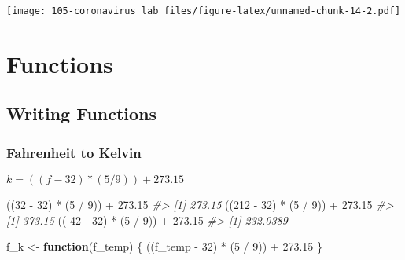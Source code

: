 \documentclass[
]{book}
\newenvironment{Shaded}{\begin{snugshade}}{\end{snugshade}}
\newcommand{\CommentTok}[1]{\textcolor[rgb]{0.56,0.35,0.01}{\textit{#1}}}
\newcommand{\ControlFlowTok}[1]{\textcolor[rgb]{0.13,0.29,0.53}{\textbf{#1}}}
\newcommand{\DecValTok}[1]{\textcolor[rgb]{0.00,0.00,0.81}{#1}}
\newcommand{\FloatTok}[1]{\textcolor[rgb]{0.00,0.00,0.81}{#1}}
\newcommand{\NormalTok}[1]{#1}
\newcommand{\OtherTok}[1]{\textcolor[rgb]{0.56,0.35,0.01}{#1}}
\newcommand{\SpecialCharTok}[1]{\textcolor[rgb]{0.00,0.00,0.00}{#1}}
\begin{document}
\texttt{[image: 105-coronavirus\_lab\_files/figure-latex/unnamed-chunk-14-2.pdf]}

\hypertarget{functions}{%
\chapter{Functions}\label{functions}}

\hypertarget{writing-functions}{%
\section{Writing Functions}\label{writing-functions}}

\hypertarget{fahrenheit-to-kelvin}{%
\subsection{Fahrenheit to Kelvin}\label{fahrenheit-to-kelvin}}

\(k = ((f - 32) * (5 / 9)) + 273.15\)

\begin{Shaded}
\begin{Highlighting}[]
\NormalTok{((}\DecValTok{32} \SpecialCharTok{{-}} \DecValTok{32}\NormalTok{) }\SpecialCharTok{*}\NormalTok{ (}\DecValTok{5} \SpecialCharTok{/} \DecValTok{9}\NormalTok{)) }\SpecialCharTok{+} \FloatTok{273.15}
\CommentTok{\#\textgreater{} [1] 273.15}
\NormalTok{((}\DecValTok{212} \SpecialCharTok{{-}} \DecValTok{32}\NormalTok{) }\SpecialCharTok{*}\NormalTok{ (}\DecValTok{5} \SpecialCharTok{/} \DecValTok{9}\NormalTok{)) }\SpecialCharTok{+} \FloatTok{273.15}
\CommentTok{\#\textgreater{} [1] 373.15}
\NormalTok{((}\SpecialCharTok{{-}}\DecValTok{42} \SpecialCharTok{{-}} \DecValTok{32}\NormalTok{) }\SpecialCharTok{*}\NormalTok{ (}\DecValTok{5} \SpecialCharTok{/} \DecValTok{9}\NormalTok{)) }\SpecialCharTok{+} \FloatTok{273.15}
\CommentTok{\#\textgreater{} [1] 232.0389}
\end{Highlighting}
\end{Shaded}

\begin{Shaded}
\begin{Highlighting}[]
\NormalTok{f\_k }\OtherTok{\textless{}{-}} \ControlFlowTok{function}\NormalTok{(f\_temp) \{}
\NormalTok{    ((f\_temp }\SpecialCharTok{{-}} \DecValTok{32}\NormalTok{) }\SpecialCharTok{*}\NormalTok{ (}\DecValTok{5} \SpecialCharTok{/} \DecValTok{9}\NormalTok{)) }\SpecialCharTok{+} \FloatTok{273.15}
\NormalTok{\}}
\end{Highlighting}
\end{Shaded}
\end{document}
